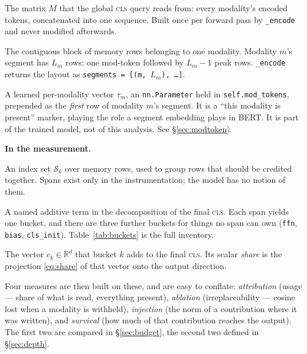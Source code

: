 \documentclass[11pt]{article}
\theoremstyle{plain}
\theoremstyle{remark}
\newcommand{\R}{\mathbb{R}}
\newcommand{\Sset}{\mathcal{S}}
\newcommand{\code}[1]{\texttt{\small #1}}
\begin{document}
\begin{description}\setlength{\itemsep}{4pt}
  \item[Memory] The matrix $M$ that the global \textsc{cls} query reads from:
    every modality's encoded tokens, concatenated into one sequence. Built once
    per forward pass by \code{\_encode} and never modified afterwards.
  \item[Segment] The contiguous block of memory rows belonging to one modality.
    Modality $m$'s segment has $L_m$ rows: one mod-token followed by $L_m - 1$
    peak rows. \code{\_encode} returns the layout as
    \code{segments = [(m, $L_m$), \dots]}.
  \item[Mod-token] A learned per-modality vector $\tau_m$, an
    \code{nn.Parameter} held in \code{self.mod\_tokens}, prepended as the
    \emph{first} row of modality $m$'s segment. It is a ``this modality is
    present'' marker, playing the role a segment embedding plays in BERT. It is
    part of the trained model, not of this analysis. See
    \S\ref{sec:modtoken}.
\end{description}

\medskip
\noindent\textbf{In the measurement.}

\begin{description}\setlength{\itemsep}{4pt}
  \item[Span] An index set $\Sset_k$ over memory rows, used to group rows that
    should be credited together. Spans exist only in the instrumentation; the
    model has no notion of them.
  \item[Bucket] A named additive term in the decomposition of the final
    \textsc{cls}. Each span yields one bucket, and there are three further
    buckets for things no span can own (\code{ffn}, \code{bias},
    \code{cls\_init}). Table~\ref{tab:buckets} is the full inventory.
  \item[Contribution] The vector $c_k \in \R^d$ that bucket $k$ adds to the
    final \textsc{cls}. Its scalar \emph{share} is the projection
    \eqref{eq:share} of that vector onto the output direction.
\end{description}

\medskip
\noindent
Four measures are then built on these, and are easy to conflate:
\emph{attribution} (usage --- share of what is read, everything present),
\emph{ablation} (irreplaceability --- cosine lost when a modality is withheld),
\emph{injection} (the norm of a contribution where it was written), and
\emph{survival} (how much of that contribution reaches the output). The first
two are compared in \S\ref{sec:budget}, the second two defined in
\S\ref{sec:depth}.
\end{document}
